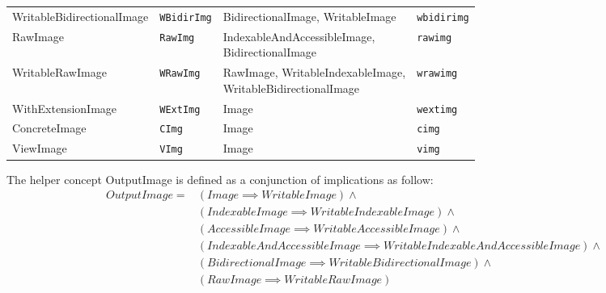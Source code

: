 \begin{table}[!htbp]
\begin{scriptsize}
\begin{tabular}{llll}
      WritableBidirectionalImage & \texttt{WBidirImg}    & BidirectionalImage, WritableImage              & \texttt{wbidirimg}       \\
      RawImage                   & \texttt{RawImg}       & \makecell[l]{IndexableAndAccessibleImage,                                 \\BidirectionalImage}                              & \texttt{rawimg}          \\
      WritableRawImage           & \texttt{WRawImg}      & \makecell[l]{RawImage, WritableIndexableImage,                            \\WritableBidirectionalImage}                 & \texttt{wrawimg}         \\
      WithExtensionImage         & \texttt{WExtImg}      & Image                                          & \texttt{wextimg}         \\
      ConcreteImage              & \texttt{CImg}         & Image                                          & \texttt{cimg}            \\
      ViewImage                  & \texttt{VImg}         & Image                                          & \texttt{vimg}            \\
      \cline{1-4}
    \end{tabular}
    \smallskip

    The helper concept OutputImage is defined as a conjunction of implications as follow:
    \begin{equation}
      \begin{aligned}
        OutputImage ={} & (Image \implies WritableImage) \wedge                                             \\
                        & (IndexableImage \implies WritableIndexableImage) \wedge                           \\
                        & (AccessibleImage \implies WritableAccessibleImage) \wedge                         \\
                        & (IndexableAndAccessibleImage \implies WritableIndexableAndAccessibleImage) \wedge \\
                        & (BidirectionalImage \implies WritableBidirectionalImage) \wedge                   \\
                        & (RawImage \implies WritableRawImage)
      \end{aligned}
    \end{equation}
    \smallskip


\end{scriptsize}
\end{table}

